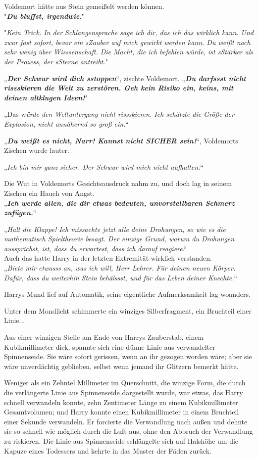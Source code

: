 {Voldemort hätte aus Stein gemeißelt werden können.\\ "\textbf{\emph{Du bluffst, irgendwie}}."

"\emph{Kein Trick. In der Schlangensprache sage ich dir, das ich das wirklich kann. Und zwar fast sofort, bevor ein sZauber auf mich gewirkt werden kann. Du weißt noch sehr wenig über Wisssenschaft. Die Macht, die ich befehlen würde, ist sStärker als der Prozess, der sSterne antreibt.}"

„\textbf{\emph{Der Schwur wird dich sstoppen}}“, zischte Voldemort. „\textbf{\emph{Du darfssst nicht rissskieren die Welt zu zerstören. Geh kein Risiko ein, keins, mit deinen altklugen Ideen!}}"

„Das w\emph{ürde den Weltuntergang nicht rissskieren. Ich schätzte die Größe der Explosion, nicht annähernd so groß ein.}“

„\textbf{\emph{Du weißt es nicht, Narr! Kannst nicht SICHER sein!}}“, Voldemorts Zischen wurde lauter.

„\emph{Ich bin mir ganz sicher. Der Schwur wird mich nicht aufhalten.}“

Die Wut in Voldemorts Gesichtsausdruck nahm zu, und doch lag in seinem Zischen ein Hauch von Angst.\\ „\textbf{\emph{Ich werde allen, die dir etwas bedeuten, unvorstellbaren Schmerz zufügen.}}“

„\emph{Halt die Klappe! Ich missachte jetzt alle deine Drohungen, so wie es die mathematisch Spieltheorie besagt. Der einzige Grund, warum du Drohungen aussprichst, ist, dass du erwartest, dass ich darauf reagiere}.“\\ Auch das hatte Harry in der letzten Extremität wirklich verstanden.\\ „\emph{Biete mir etwasss an, was ich will, Herr Lehrer. Für deinen neuen Körper. Dafür, dass du weiterhin Stein behälssst, und für das Leben deiner Knechte.}“

Harrys Mund lief auf Automatik, seine eigentliche Aufmerksamkeit lag woanders.

Unter dem Mondlicht schimmerte ein winziges Silberfragment, ein Bruchteil einer Linie...

Aus einer winzigen Stelle am Ende von Harrys Zauberstab, einem Kubikmillimeter dick, spannte sich eine dünne Linie aus verwandelter Spinnenseide. Sie wäre sofort gerissen, wenn an ihr gezogen worden wäre; aber sie wäre unverdächtig geblieben, selbst wenn jemand ihr Glitzern bemerkt hätte.

Weniger als ein Zehntel Millimeter im Querschnitt, die winzige Form, die durch die verlängerte Linie aus Spinnenseide dargestellt wurde, war etwas, das Harry schnell verwandeln konnte, zehn Zentimeter Länge zu einem Kubikmillimeter Gesamtvolumen; und Harry konnte einen Kubikmillimeter in einem Bruchteil einer Sekunde verwandeln. Er forcierte die Verwandlung nach außen und dehnte sie so schnell wie möglich durch die Luft aus, ohne den Abbruch der Verwandlung zu riskieren. Die Linie aus Spinnenseide schlängelte sich auf Halshöhe um die Kapuze eines Todessers und kehrte in das Muster der Fäden zurück.

}

